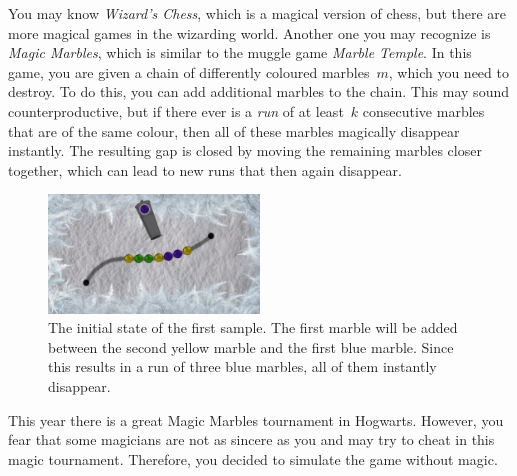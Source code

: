 
You may know \emph{Wizard's Chess}, which is a magical version of chess, but there are more magical games in the wizarding world.
Another one you may recognize is \emph{Magic Marbles}, which is similar to the muggle game \emph{Marble Temple}.
In this game, you are given a chain of differently coloured marbles~$m$, which you need to destroy.
To do this, you can add additional marbles to the chain.
This may sound counterproductive, but if there ever is a \emph{run} of at least~$k$ consecutive marbles that are of the same colour, then all of these marbles magically disappear instantly.
The resulting gap is closed by moving the remaining marbles closer together, which can lead to new runs that then again disappear.

\begin{figure}[!h]
	\centering
	\includegraphics[width=0.5\textwidth]{sample}
	\caption{The initial state of the first sample.
	The first marble will be added between the second yellow marble and the first blue marble.
	Since this results in a run of three blue marbles, all of them instantly disappear.}
\end{figure}

This year there is a great Magic Marbles tournament in Hogwarts.
However, you fear that some magicians are not as sincere as you and may try to cheat in this magic tournament.
Therefore, you decided to simulate the game without magic.

